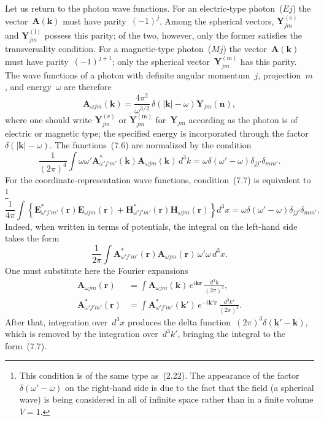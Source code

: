 Let us return to the photon wave functions. For an electric-type photon~($Ej$) the vector~$\mathbf{A}(\mathbf{k})$ must have parity~$(-1)^j$. Among the spherical vectors, $\mathbf{Y}_{jm}^{(\text{e})}$ and $\mathbf{Y}_{jm}^{(\text{l})}$ possess this parity; of the two, however, only the former satisfies the transversality condition. For a magnetic-type photon~($Mj$) the vector~$\mathbf{A}(\mathbf{k})$ must have
parity~$(-1)^{j+1}$; only the spherical vector~$\mathbf{Y}_{jm}^{(\text{m})}$ has this parity. The wave functions of a photon with definite angular momentum~$j$, projection~$m$, and energy~$\omega$ are therefore
\begin{equation}
\mathbf{A}_{\omega jm}(\mathbf{k}) = \frac{4\pi^2}{\omega^{3/2}}\,\delta(|\mathbf{k}| - \omega)\mathbf{Y}_{jm}(\mathbf{n}),
\tag{7.6}
\end{equation}
where one should write $\mathbf{Y}_{jm}^{(\text{e})}$ or $\mathbf{Y}_{jm}^{(\text{m})}$ for~$\mathbf{Y}_{jm}$ according as the photon is of electric or magnetic type; the specified energy is incorporated through the factor~$\delta(|\mathbf{k}| - \omega)$. The functions~(7.6) are normalized by the condition
\begin{equation}
\frac{1}{(2\pi)^4}\int \omega\omega'\mathbf{A}_{\omega'j'm'}^*(\mathbf{k})\mathbf{A}_{\omega jm}(\mathbf{k})\,d^3k = \omega\delta(\omega' - \omega)\delta_{jj'}\delta_{mm'}.
\tag{7.7}
\end{equation}
For the coordinate-representation wave functions, condition~(7.7) is equivalent to\,\footnote{This condition is of the same type as~(2.22). The appearance of the factor~$\delta(\omega' - \omega)$ on the right-hand side is due to the fact that the field (a spherical wave) is being considered in all of infinite space rather than in a finite volume $V = 1$.}
\begin{equation}
\frac{1}{4\pi}\int \left\{\mathbf{E}_{\omega'j'm'}^*(\mathbf{r})\mathbf{E}_{\omega jm}(\mathbf{r}) + \mathbf{H}_{\omega'j'm'}^*(\mathbf{r})\mathbf{H}_{\omega jm}(\mathbf{r})\right\} d^3x = \omega\delta(\omega' - \omega)\delta_{jj'}\delta_{mm'}.
\tag{7.8}
\end{equation}
Indeed, when written in terms of potentials, the integral on the left-hand side takes the form
\[
\frac{1}{2\pi}\int \mathbf{A}_{\omega'j'm'}^*(\mathbf{r})\mathbf{A}_{\omega jm}(\mathbf{r})\,\omega'\omega\,d^3x.
\]
One must substitute here the Fourier expansions
\begin{equation}
\begin{aligned}
\mathbf{A}_{\omega jm}(\mathbf{r}) &= \int \mathbf{A}_{\omega jm}(\mathbf{k})\,e^{i\mathbf{kr}}\,\frac{d^3k}{(2\pi)^3},\\
\mathbf{A}_{\omega'j'm'}^*(\mathbf{r}) &= \int \mathbf{A}_{\omega'j'm'}^*(\mathbf{k}')\,e^{-i\mathbf{k}'\mathbf{r}}\,\frac{d^3k'}{(2\pi)^3}.
\end{aligned}
\tag{7.9}
\end{equation}
After that, integration over~$d^3x$ produces the delta function~$(2\pi)^3\delta(\mathbf{k}' - \mathbf{k})$, which is removed by the integration over~$d^3k'$, bringing the integral to the form~(7.7).


